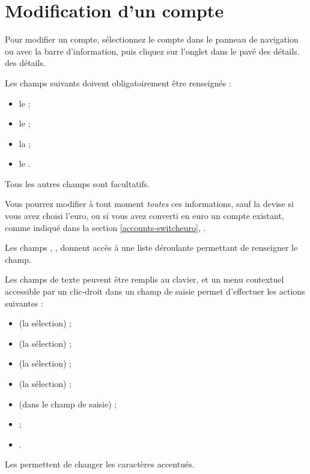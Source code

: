\section{Modification d'un compte\label{accounts-modify} }


Pour modifier un compte, sélectionnez le compte dans le panneau de navigation ou avec la barre d'information, puis cliquez sur l'onglet  dans le pavé \ifIllustration des détails.
\else des détails.
\fi

Les champs suivants doivent obligatoirement être renseignés :
\begin{itemize}
	 \item le  ;
	 \item le  ;
	 \item la  ;
	 \item le .
\end{itemize}
Tous les autres champs sont facultatifs. 


Vous pourrez modifier à tout moment \emph{toutes} ces informations, sauf la devise si vous avez choisi l'euro, ou si vous avez converti en euro un compte
existant, comme indiqué dans la section \vref{accounts-switcheuro}, .

Les champs , ,  donnent accès à une liste déroulante permettant de renseigner le champ.

Les champs de texte peuvent être remplis au clavier, et un menu contextuel accessible par un clic-droit dans un champ de saisie permet d'effectuer les actions suivantes :
\begin{itemize}
	 \item {} (la sélection) ;
	 \item {} (la sélection) ;
	 \item {} (la sélection) ;
	 \item {} (la sélection) ;
	 \item {} (dans le champ de saisie) ;
	 \item {} ;
	 \item {}.
\end{itemize}

Les  permettent de changer les caractères accentués.

